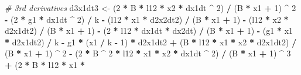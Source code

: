 \documentclass[12pt,twoside,openany]{reedthesis}
\newenvironment{Shaded}{\begin{snugshade}}{\end{snugshade}}
\newcommand{\CommentTok}[1]{\textcolor[rgb]{0.56,0.35,0.01}{\textit{#1}}}
\newcommand{\DecValTok}[1]{\textcolor[rgb]{0.00,0.00,0.81}{#1}}
\newcommand{\NormalTok}[1]{#1}
\newcommand{\OperatorTok}[1]{\textcolor[rgb]{0.81,0.36,0.00}{\textbf{#1}}}
\newcommand{\StringTok}[1]{\textcolor[rgb]{0.31,0.60,0.02}{#1}}
\begin{document}
\begin{Shaded}
\begin{Highlighting}[]
  \CommentTok{# 3rd derivatives}
\NormalTok{  d3x1dt3 <-}
\StringTok{  }\NormalTok{(}\DecValTok{2} \OperatorTok{*}\StringTok{ }\NormalTok{B }\OperatorTok{*}\StringTok{ }\NormalTok{l12 }\OperatorTok{*}\StringTok{ }\NormalTok{x2 }\OperatorTok{*}\StringTok{ }\NormalTok{dx1dt }\OperatorTok{^}\StringTok{ }\DecValTok{2}\NormalTok{) }\OperatorTok{/}\StringTok{ }\NormalTok{(B }\OperatorTok{*}\StringTok{ }\NormalTok{x1 }\OperatorTok{+}\StringTok{ }\DecValTok{1}\NormalTok{) }\OperatorTok{^}\StringTok{ }\DecValTok{2} \OperatorTok{-}\StringTok{ }\NormalTok{(}\DecValTok{2} \OperatorTok{*}\StringTok{ }\NormalTok{g1 }\OperatorTok{*}\StringTok{ }\NormalTok{dx1dt }\OperatorTok{^}\StringTok{ }\DecValTok{2}\NormalTok{) }\OperatorTok{/}
\StringTok{  }\NormalTok{k }\OperatorTok{-}\StringTok{ }\NormalTok{(l12 }\OperatorTok{*}\StringTok{ }\NormalTok{x1 }\OperatorTok{*}\StringTok{ }\NormalTok{d2x2dt2) }\OperatorTok{/}\StringTok{ }\NormalTok{(B }\OperatorTok{*}\StringTok{ }\NormalTok{x1 }\OperatorTok{+}\StringTok{ }\DecValTok{1}\NormalTok{) }\OperatorTok{-}\StringTok{ }\NormalTok{(l12 }\OperatorTok{*}\StringTok{ }\NormalTok{x2 }\OperatorTok{*}\StringTok{ }\NormalTok{d2x1dt2) }\OperatorTok{/}\StringTok{ }\NormalTok{(B }\OperatorTok{*}\StringTok{ }\NormalTok{x1 }\OperatorTok{+}\StringTok{ }\DecValTok{1}\NormalTok{) }\OperatorTok{-}\StringTok{ }\NormalTok{(}\DecValTok{2} \OperatorTok{*}
\StringTok{  }\NormalTok{l12 }\OperatorTok{*}\StringTok{ }\NormalTok{dx1dt }\OperatorTok{*}\StringTok{ }\NormalTok{dx2dt) }\OperatorTok{/}\StringTok{ }\NormalTok{(B }\OperatorTok{*}\StringTok{ }\NormalTok{x1 }\OperatorTok{+}\StringTok{ }\DecValTok{1}\NormalTok{) }\OperatorTok{-}\StringTok{ }\NormalTok{(g1 }\OperatorTok{*}\StringTok{ }\NormalTok{x1 }\OperatorTok{*}\StringTok{ }\NormalTok{d2x1dt2) }\OperatorTok{/}\StringTok{ }\NormalTok{k }\OperatorTok{-}\StringTok{ }\NormalTok{g1 }\OperatorTok{*}\StringTok{ }\NormalTok{(x1 }\OperatorTok{/}
\StringTok{  }\NormalTok{k }\OperatorTok{-}\StringTok{ }\DecValTok{1}\NormalTok{) }\OperatorTok{*}\StringTok{ }\NormalTok{d2x1dt2 }\OperatorTok{+}\StringTok{ }\NormalTok{(B }\OperatorTok{*}\StringTok{ }\NormalTok{l12 }\OperatorTok{*}\StringTok{ }\NormalTok{x1 }\OperatorTok{*}\StringTok{ }\NormalTok{x2 }\OperatorTok{*}\StringTok{ }\NormalTok{d2x1dt2) }\OperatorTok{/}\StringTok{ }\NormalTok{(B }\OperatorTok{*}\StringTok{ }\NormalTok{x1 }\OperatorTok{+}\StringTok{ }\DecValTok{1}\NormalTok{) }\OperatorTok{^}\StringTok{ }\DecValTok{2} \OperatorTok{-}\StringTok{ }\NormalTok{(}\DecValTok{2} \OperatorTok{*}
\StringTok{  }\NormalTok{B }\OperatorTok{^}\StringTok{ }\DecValTok{2} \OperatorTok{*}\StringTok{ }\NormalTok{l12 }\OperatorTok{*}\StringTok{ }\NormalTok{x1 }\OperatorTok{*}\StringTok{ }\NormalTok{x2 }\OperatorTok{*}\StringTok{ }\NormalTok{dx1dt }\OperatorTok{^}\StringTok{ }\DecValTok{2}\NormalTok{) }\OperatorTok{/}\StringTok{ }\NormalTok{(B }\OperatorTok{*}\StringTok{ }\NormalTok{x1 }\OperatorTok{+}\StringTok{ }\DecValTok{1}\NormalTok{) }\OperatorTok{^}\StringTok{ }\DecValTok{3} \OperatorTok{+}\StringTok{ }\NormalTok{(}\DecValTok{2} \OperatorTok{*}\StringTok{ }\NormalTok{B }\OperatorTok{*}\StringTok{ }\NormalTok{l12 }\OperatorTok{*}\StringTok{ }\NormalTok{x1 }\OperatorTok{*}

\end{Highlighting}
\end{Shaded}
\end{document}
